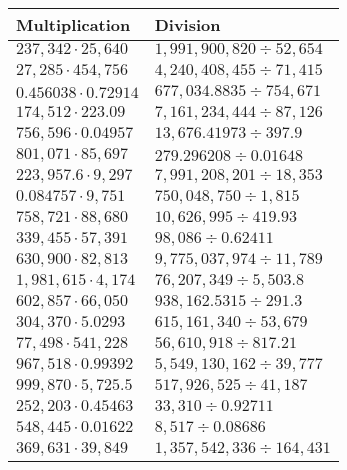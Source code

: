 \begin{longtable}[]{@{}ll@{}}
\toprule
Multiplication & Division\tabularnewline
\midrule
\endhead
\(237,342\cdot25,640\) & \(1,991,900,820÷52,654\)\tabularnewline
\(27,285\cdot454,756\) & \(4,240,408,455÷71,415\)\tabularnewline
\(0.456038\cdot0.72914\) & \(677,034.8835÷754,671\)\tabularnewline
\(174,512\cdot223.09\) & \(7,161,234,444÷87,126\)\tabularnewline
\(756,596\cdot0.04957\) & \(13,676.41973÷397.9\)\tabularnewline
\(801,071\cdot85,697\) & \(279.296208÷0.01648\)\tabularnewline
\(223,957.6\cdot9,297\) & \(7,991,208,201÷18,353\)\tabularnewline
\(0.084757\cdot9,751\) & \(750,048,750÷1,815\)\tabularnewline
\(758,721\cdot88,680\) & \(10,626,995÷419.93\)\tabularnewline
\(339,455\cdot57,391\) & \(98,086÷0.62411\)\tabularnewline
\(630,900\cdot82,813\) & \(9,775,037,974÷11,789\)\tabularnewline
\(1,981,615\cdot4,174\) & \(76,207,349÷5,503.8\)\tabularnewline
\(602,857\cdot66,050\) & \(938,162.5315÷291.3\)\tabularnewline
\(304,370\cdot5.0293\) & \(615,161,340÷53,679\)\tabularnewline
\(77,498\cdot541,228\) & \(56,610,918÷817.21\)\tabularnewline
\(967,518\cdot0.99392\) & \(5,549,130,162÷39,777\)\tabularnewline
\(999,870\cdot5,725.5\) & \(517,926,525÷41,187\)\tabularnewline
\(252,203\cdot0.45463\) & \(33,310÷0.92711\)\tabularnewline
\(548,445\cdot0.01622\) & \(8,517÷0.08686\)\tabularnewline
\(369,631\cdot39,849\) & \(1,357,542,336÷164,431\)\tabularnewline
\bottomrule
\end{longtable}

